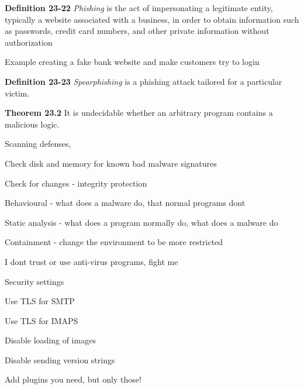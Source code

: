 \documentclass[Screen16to9,17pt]{foils}
\begin{document}


\begin{list1}
\item {\bf Definition 23-22} \emph{Phishing} is the act of impersonating a legitimate entity, typically a website associated with a business, in order to obtain information such as passwords, credit card numbers, and other private information without authorization
\item Example creating a fake bank website and make customers try to login
\item {\bf Definition 23-23} \emph{Spearphishing} is a phishing attack tailored for a particular victim.
\end{list1}




\begin{list1}
\item {\bf Theorem 23.2} It is undecidable whether an arbitrary program contains a malicious logic.
\item Scanning defenses,
\begin{list2}
\item Check disk and memory for known bad malware signatures
\item Check for changes - integrity protection
\end{list2}
\item Behavioural - what does a malware do, that normal programs dont
\item Static analysis - what does a program normally do, what does a malware do
\item Containment - change the environment to be more restricted
\end{list1}

\centerline{I dont trust or use anti-virus programs, fight me}


\begin{list2}
\item
\end{list2}


\begin{list2}
\item Security settings
\item Use TLS for SMTP
\item Use TLS for IMAPS
\item Disable loading of images
\item Disable sending version strings
\item Add plugins you need, but only those!
\end{list2}
\end{document}
